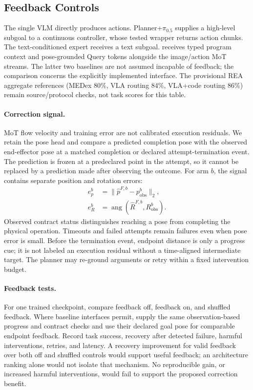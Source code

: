 \subsection{Feedback Controls}
The single VLM directly produces actions. Planner+$\pi_{0.5}$ supplies a high-level subgoal to a continuous controller, whose tested wrapper returns action chunks. The text-conditioned expert receives a text subgoal. \model{} receives typed program context and pose-grounded Query tokens alongside the image/action MoT streams. The latter two baselines are not assumed incapable of feedback; the comparison concerns the explicitly implemented interface. The provisional REA aggregate references (MEDex 80\%, VLA routing 84\%, VLA+code routing 86\%) remain source/protocol checks, not task scores for this table.

\paragraph{Correction signal.}
MoT flow velocity and training error are not calibrated execution residuals. We retain the pose head and compare a predicted completion pose with the observed end-effector pose at a matched completion or declared attempt-termination event. The prediction is frozen at a predeclared point in the attempt, so it cannot be replaced by a prediction made after observing the outcome. For arm $b$, the signal contains separate position and rotation errors:
\begin{align}
e_p^b&=\|\widehat p^{F,b}-p_{\mathrm{obs}}^b\|_2,\\
e_R^b&=\operatorname{ang}(\widehat R^{F,b},R_{\mathrm{obs}}^b).
\end{align}
Observed contract status distinguishes reaching a pose from completing the physical operation. Timeouts and failed attempts remain failures even when pose error is small. Before the termination event, endpoint distance is only a progress cue; it is not labeled an execution residual without a time-aligned intermediate target. The planner may re-ground arguments or retry within a fixed intervention budget.

\paragraph{Feedback tests.}
For one trained checkpoint, compare feedback off, feedback on, and shuffled feedback. Where baseline interfaces permit, supply the same observation-based progress and contract checks and use their declared goal pose for comparable endpoint feedback. Record task success, recovery after detected failure, harmful interventions, retries, and latency. A recovery improvement for valid feedback over both off and shuffled controls would support useful feedback; an architecture ranking alone would not isolate that mechanism. No reproducible gain, or increased harmful interventions, would fail to support the proposed correction benefit.
